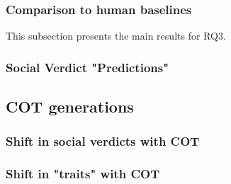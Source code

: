 \subsubsection{Comparison to human baselines}\label{sec:posterchild1.2}
This subsection presents the main results for RQ3.
\textcolor{black!30}{\lipsum[48-49]}

\subsubsection{Social Verdict "Predictions"}\label{sec:posterchild2.1}


\subsection{COT generations}
\subsubsection{Shift in social verdicts with COT}\label{sec:posterchild2.2}
\textcolor{black!30}{\lipsum[48-49]}

\subsubsection{Shift in "traits" with COT}
\textcolor{black!30}{\lipsum[48-49]}

